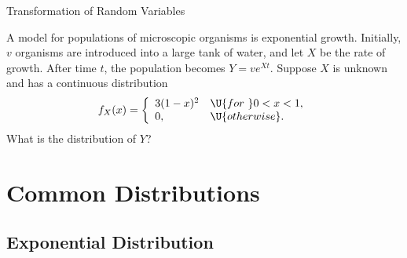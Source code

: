 \begin{frame}{Transformation of Random Variables}

\justifying
{} A model for populations of microscopic organisms is exponential growth. Initially, $v$ organisms are introduced into a large tank of water, and let $X$ be the rate of growth. After time $t$, the population becomes $Y = ve^{Xt}$. Suppose $X$ is unknown and has a continuous distribution
\begin{align*}
f_X(x) = \left\{
\begin{array}{ll}
3(1-x)^2 & \U{for\ } 0 < x < 1, \\
0, & \U{otherwise}.
\end{array}
\right.
\end{align*}
What is the distribution of $Y$? \\


\end{frame}


\section{Common Distributions}

\subsection{Exponential Distribution}

